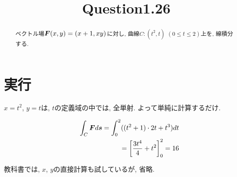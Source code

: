 \documentclass{jsarticle} \usepackage[dvipdfmx]{graphicx} \usepackage[dvipdfmx]{hyperref}
\title{Question1.26}
\newcommand*{\mbold}[1]{\mbox{\boldmath $#1$}}
\begin{document}
\maketitle

\begin{abstract}
  ベクトル場$\mbold{F}(x, y) = (x + 1, xy)$に対し, 曲線$C:(t^2, t)$ $(0\leq t \leq 2)$上を, 線積分する. 
\end{abstract}

\section*{実行}
$x = t^2$, $y = t$は, $t$の定義域の中では, 全単射. よって単純に計算するだけ. 

\begin{eqnarray}
  && \int_C \mbold{F} d\mbold{s} = \int_0^2 ((t^2 + 1)\cdot 2t + t^3)dt \nonumber \\
  && = \left[ \frac{3 t^4}{4} + t^2 \right]_0^2 = 16
\end{eqnarray}

教科書では, $x$, $y$の直接計算も試しているが, 省略. 
\end{document}
